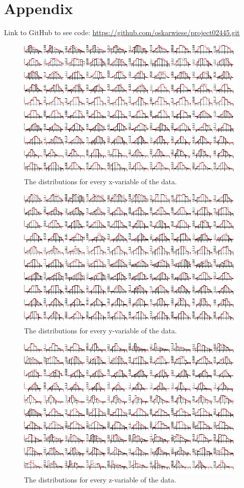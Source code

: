 \documentclass[11pt, fleqn, titlepage]{article}
\begin{document}
\section{Appendix}
Link to GitHub to see code:
\url{https://github.com/oskarwiese/project02445.git}

\begin{figure}[H]
	\centering
	\includegraphics[width=0.9\linewidth]{billeder/x_dists}
	\caption{The distributions for every x-variable of the data.}
	\label{fig:xdists}
\end{figure}

\begin{figure}[H]
	\centering
	\includegraphics[width=0.9\linewidth]{billeder/y_dists}
	\caption{The distributions for every y-variable of the data.}
	\label{fig:ydists}
\end{figure}

\begin{figure}[H]
	\centering
	\includegraphics[width=0.9\linewidth]{billeder/z_dists}
	\caption{The distributions for every z-variable of the data.}
	\label{fig:zdists}
\end{figure}
\end{document}
